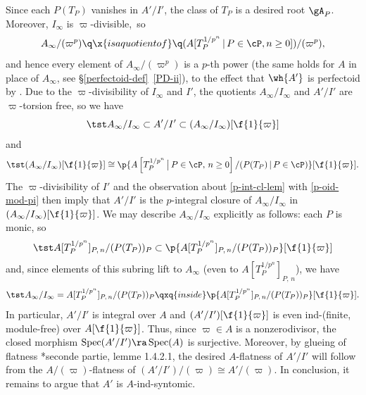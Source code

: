 Since each $P(T_P)$ vanishes in $A'/I'$, the class of $T_P$ is a desired root $\gA_P$. Moreover, $I_\infty$ is $\varpi$-divisible,~so
\[
A_\infty/(\varpi^p) \q \x{is a quotient of} \q (A[T_P^{1/p^n} \, \vert\, P \in \cP, n \ge 0])/(\varpi^p),
\]
and hence every element of $A_\infty/(\varpi^p)$ is a $p$-th power (the same holds for $A$ in place of $A_\infty$, see \S\ref{perfectoid-def}~\ref{PD-ii}), to the effect that $\wh{A'}$ is perfectoid by . Due to the $\varpi$-divisibility of $I_\infty$ and $I'$, the quotients $A_\infty/I_\infty$ and $A'/I'$ are $\varpi$-torsion free, so we have
\[
\tst A_\infty/I_\infty \subset A'/I' \subset (A_\infty/I_\infty)[\f{1}{\varpi}]
\]
and
\[
\tst (A_\infty/I_\infty)[\f{1}{\varpi}] \cong \p{A\left[T_P^{1/p^n} \, \big\vert\, P \in \cP,\, n \ge 0\right]/(P(T_P)\,  |\,  P \in \cP)}[\f{1}{\varpi}].
\]
The $\varpi$-divisibility of $I'$ and the observation about \eqref{p-int-cl-lem} with \eqref{p-oid-mod-pi} then imply that $A'/I'$ is the $p$-integral closure of $A_\infty/I_\infty$ in $(A_\infty/I_\infty)[\f{1}{\varpi}]$. We may describe $A_\infty/I_\infty$ explicitly as follows: each $P$ is monic, so
\[
\tst A[T_P^{1/p^n}]_{P,\, n}/(P(T_P))_P \subset \p{A[T_P^{1/p^n} ]_{P,\, n}/(P(T_P))_P}[\f{1}{\varpi}]
\]
and, since  elements of this subring lift to $A_\infty$ (even to $A[T_P^{1/p^n}]_{P,\, n}$), we have
\[
\tst A_\infty/I_\infty = A[T_P^{1/p^n}]_{P,\, n}/(P(T_P))_P \qxq{inside} \p{A[T_P^{1/p^n} ]_{P,\, n}/(P(T_P))_P}[\f{1}{\varpi}].
\]
In particular, $A'/I'$ is integral over $A$ %
and $(A'/I')[\f{1}{\varpi}]$ is even ind-(finite, module-free) over $A[\f{1}{\varpi}]$. Thus, since  $\varpi \in A$ is a nonzerodivisor, the closed morphism $\Spec(A'/I') \ra \Spec(A)$ is surjective. Moreover, by glueing of flatness \cite{RG71}*{seconde partie, lemme 1.4.2.1}, the desired $A$-flatness of $A'/I'$ will follow from the $A/(\varpi)$-flatness of $(A'/I')/(\varpi) \cong A'/(\varpi)$. In conclusion, it remains to argue that $A'$ is $A$-ind-syntomic.


